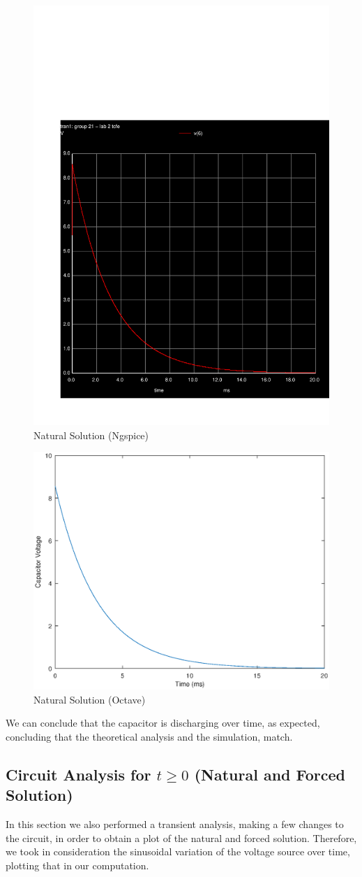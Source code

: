 \begin{figure}[h!]\centering
\includegraphics[width=0.5\linewidth]{question_3.pdf}
\caption{Natural Solution (Ngspice)}
\label{fig:snat}
\end{figure}

\begin{figure}[h!] \centering
\includegraphics[width=0.5\linewidth]{naturalsolution.eps}
\caption{Natural Solution (Octave)}
\label{fig:snat}
\end{figure}


We can conclude that the capacitor is discharging over time, as expected, concluding that the theoretical analysis and the simulation, match.

\newpage
\subsection{Circuit Analysis for $t \geq 0 $ (Natural and Forced Solution)}

In this section we also performed a transient analysis, making a few changes to the circuit, in order to obtain a plot of the natural and forced solution. Therefore, we took in consideration the sinusoidal variation of the voltage source over time, plotting that in our computation.

